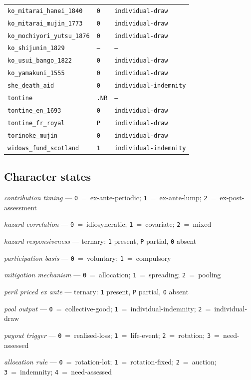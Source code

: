 \documentclass[11pt,a4paper]{article}
\begin{document}
\begin{table}[htbp]
\begin{tabular}{lll}
\texttt{ko\_mitarai\_hanei\_1840} & \texttt{0} & \texttt{individual-draw} \\
\texttt{ko\_mitarai\_mujin\_1773} & \texttt{0} & \texttt{individual-draw} \\
\texttt{ko\_mochiyori\_yutsu\_1876} & \texttt{0} & \texttt{individual-draw} \\
\texttt{ko\_shijunin\_1829} & \texttt{--} & \texttt{--} \\
\texttt{ko\_usui\_bango\_1822} & \texttt{0} & \texttt{individual-draw} \\
\texttt{ko\_yamakuni\_1555} & \texttt{0} & \texttt{individual-draw} \\
\texttt{she\_death\_aid} & \texttt{0} & \texttt{individual-indemnity} \\
\texttt{tontine} & \texttt{.NR} & \texttt{--} \\
\texttt{tontine\_en\_1693} & \texttt{0} & \texttt{individual-draw} \\
\texttt{tontine\_fr\_royal} & \texttt{P} & \texttt{individual-draw} \\
\texttt{torinoke\_mujin} & \texttt{0} & \texttt{individual-draw} \\
\texttt{widows\_fund\_scotland} & \texttt{1} & \texttt{individual-indemnity} \\
\bottomrule\end{tabular}\end{table}
\subsection*{Character states}
\begin{description}\setlength{\itemsep}{2pt}
\item[\texttt{CN1}] \textit{contribution timing} — \texttt{0}~=~ex-ante-periodic; \texttt{1}~=~ex-ante-lump; \texttt{2}~=~ex-post-assessment
\item[\texttt{HZ1}] \textit{hazard correlation} — \texttt{0}~=~idiosyncratic; \texttt{1}~=~covariate; \texttt{2}~=~mixed
\item[\texttt{HZ2}] \textit{hazard responsiveness} — ternary: \texttt{1} present, \texttt{P} partial, \texttt{0} absent
\item[\texttt{MB3}] \textit{participation basis} — \texttt{0}~=~voluntary; \texttt{1}~=~compulsory
\item[\texttt{MC1}] \textit{mitigation mechanism} — \texttt{0}~=~allocation; \texttt{1}~=~spreading; \texttt{2}~=~pooling
\item[\texttt{PR1}] \textit{peril priced ex ante} — ternary: \texttt{1} present, \texttt{P} partial, \texttt{0} absent
\item[\texttt{PY0}] \textit{pool output} — \texttt{0}~=~collective-good; \texttt{1}~=~individual-indemnity; \texttt{2}~=~individual-draw
\item[\texttt{PY1}] \textit{payout trigger} — \texttt{0}~=~realised-loss; \texttt{1}~=~life-event; \texttt{2}~=~rotation; \texttt{3}~=~need-assessed
\item[\texttt{PY2}] \textit{allocation rule} — \texttt{0}~=~rotation-lot; \texttt{1}~=~rotation-fixed; \texttt{2}~=~auction; \texttt{3}~=~indemnity; \texttt{4}~=~need-assessed
\end{description}
\end{document}

